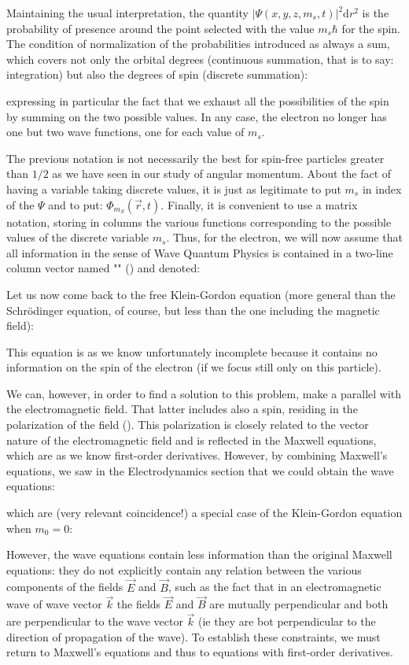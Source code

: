 	Maintaining the usual interpretation, the quantity $|\Psi(x,y,z,m_s,t)|^2\mathrm{d}r^2$ is the probability of presence around the point selected with the value $m_s\hbar$ for the spin. The condition of normalization of the probabilities introduced as always a sum, which covers not only the orbital degrees (continuous summation, that is to say: integration) but also the degrees of spin (discrete summation):
	
	expressing in particular the fact that we exhaust all the possibilities of the spin by summing on the two possible values. In any case, the electron no longer has one but two wave functions, one for each value of $m_s$.
	
	The previous notation is not necessarily the best for spin-free particles greater than $1/2$ as we have seen in our study of angular momentum. About the fact of having  a variable taking discrete values, it is just as legitimate to put $m_s$ in index of the $\Psi$ and to put: $\Phi_{m_S}(\vec{r},t)$. Finally, it is convenient to use a matrix notation, storing in columns the various functions corresponding to the possible values of the discrete variable $m_s$. Thus, for the electron, we will now assume that all information in the sense of Wave Quantum Physics is contained in a two-line column vector named "" () and denoted:
	
	Let us now come back to the free Klein-Gordon equation (more general than the Schrödinger equation, of course, but less than the one including the magnetic field):
	
	This equation is as we know unfortunately incomplete because it contains no information on the spin of the electron (if we focus still only on this particle).

	We can, however, in order to find a solution to this problem, make a parallel with the electromagnetic field. That latter includes also a spin, residing in the polarization of the field (). This polarization is closely related to the vector nature of the electromagnetic field and is reflected in the Maxwell equations, which are as we know first-order derivatives. However, by combining Maxwell's equations, we saw in the Electrodynamics section that we could obtain the wave equations:
	
	which are (very relevant coincidence!) a special case of the Klein-Gordon equation when $m_0=0$:
	
	However, the wave equations contain less information than the original Maxwell equations: they do not explicitly contain any relation between the various components of the fields $\vec{E}$ and $\vec{B}$, such as the fact that in an electromagnetic wave of wave vector $\vec{k}$ the fields $\vec{E}$ and $\vec{B}$ are mutually perpendicular and both are perpendicular to the wave vector $\vec{k}$ (ie they are bot perpendicular to the direction of propagation of the wave). To establish these constraints, we must return to Maxwell's equations and thus to equations with first-order derivatives.

